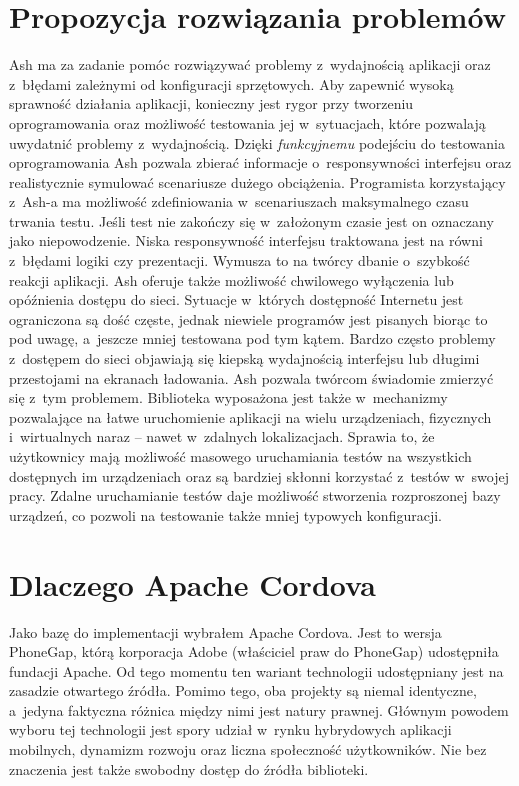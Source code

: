\documentclass{xmgr}
\begin{document}
\section{Propozycja rozwiązania problemów}
Ash ma za zadanie pomóc rozwiązywać problemy z~wydajnością aplikacji oraz z~błędami zależnymi od konfiguracji sprzętowych. Aby
zapewnić wysoką sprawność działania aplikacji, konieczny jest rygor przy tworzeniu
oprogramowania oraz możliwość testowania jej w~sytuacjach, które pozwalają
uwydatnić problemy z~wydajnością. Dzięki \textit{funkcyjnemu} podejściu do testowania
oprogramowania Ash pozwala zbierać informacje o~responsywności interfejsu
oraz realistycznie symulować scenariusze dużego obciążenia. Programista
korzystający z~Ash-a ma możliwość zdefiniowania w~scenariuszach maksymalnego
czasu trwania testu. Jeśli test nie zakończy się w~założonym czasie jest on oznaczany jako niepowodzenie. Niska responsywność interfejsu traktowana jest na równi z~błędami
logiki czy prezentacji. Wymusza to na twórcy dbanie o~szybkość reakcji aplikacji.
Ash oferuje także możliwość chwilowego wyłączenia lub opóźnienia dostępu do
sieci. Sytuacje w~których dostępność Internetu jest ograniczona są dość częste,
jednak niewiele programów jest pisanych biorąc to pod uwagę, a~jeszcze mniej 
testowana pod tym kątem. Bardzo często problemy z~dostępem do sieci objawiają się kiepską
wydajnością interfejsu lub długimi przestojami na ekranach ładowania. Ash pozwala
twórcom świadomie zmierzyć się z~tym problemem. Biblioteka wyposażona jest także w~mechanizmy pozwalające na łatwe uruchomienie aplikacji na wielu urządzeniach, fizycznych i~wirtualnych naraz -- nawet w~zdalnych lokalizacjach. Sprawia to, że
użytkownicy mają możliwość masowego uruchamiania testów na wszystkich
dostępnych im urządzeniach oraz są bardziej skłonni korzystać z~testów w~swojej pracy. Zdalne uruchamianie testów daje możliwość stworzenia
rozproszonej bazy urządzeń, co pozwoli na testowanie także mniej typowych
konfiguracji.

\section{Dlaczego Apache Cordova}
Jako bazę do implementacji wybrałem Apache Cordova. Jest to
wersja PhoneGap, którą korporacja Adobe (właściciel praw do PhoneGap) udostępniła
fundacji Apache. Od tego momentu ten wariant technologii udostępniany jest
na zasadzie otwartego źródła. Pomimo tego, oba projekty są niemal identyczne, a~jedyna faktyczna różnica między nimi jest natury prawnej. Głównym powodem
wyboru tej technologii jest spory udział w~rynku hybrydowych aplikacji mobilnych,
dynamizm rozwoju oraz liczna społeczność użytkowników. Nie bez znaczenia jest także swobodny dostęp do źródła biblioteki.
\end{document}
